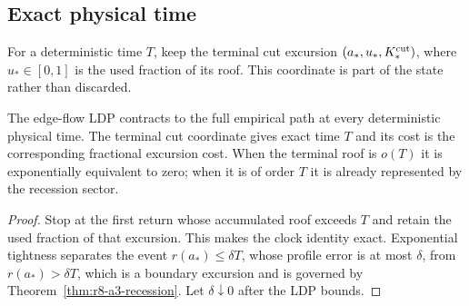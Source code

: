 \subsection{Exact physical time}

For a deterministic time $T$, keep the terminal cut excursion
$(a_*,u_*,K_*^{\rm cut})$, where $u_*\in[0,1]$ is the used fraction of its roof.
This coordinate is part of the state rather than discarded.

\begin{theorem}
\label{thm:r8-a3-time}
The edge-flow LDP contracts to the full empirical path at every deterministic
physical time.  The terminal cut coordinate gives exact time $T$ and its cost
is the corresponding fractional excursion cost.  When the terminal roof is
$o(T)$ it is exponentially equivalent to zero; when it is of order $T$ it is
already represented by the recession sector.
\end{theorem}

\begin{proof}
Stop at the first return whose accumulated roof exceeds $T$ and retain the
used fraction of that excursion.  This makes the clock identity exact.
Exponential tightness separates the event $r(a_*)\le\delta T$, whose profile
error is at most $\delta$, from $r(a_*)>\delta T$, which is a boundary
excursion and is governed by Theorem~\ref{thm:r8-a3-recession}.  Let
$\delta\downarrow0$ after the LDP bounds.
\end{proof}
